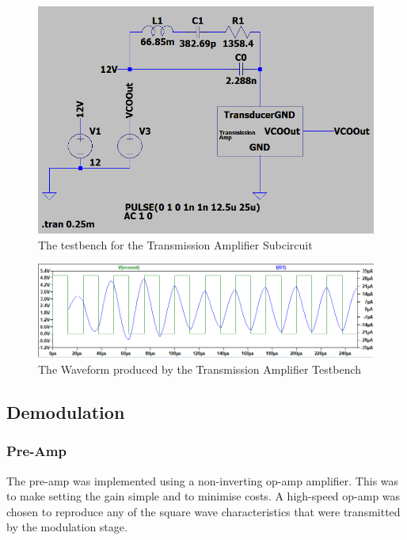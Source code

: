 \begin{figure}[H]
    \centering 
    \includegraphics[width=\textwidth]{../Circuits/Images/TransmissionAmp/TestBenchScreencap}
    \caption{The testbench for the Transmission Amplifier Subcircuit}
    \label{fig:TransmissionAmpTestBench}
\end{figure}

\begin{figure}[H]
    \centering 
    \includegraphics[width=\textwidth]{../Circuits/Images/TransmissionAmp/TestBenchWaveform}
    \caption{The Waveform produced by the Transmission Amplifier Testbench}
    \label{fig:TransmissionAmpTestBenchWaveform}
\end{figure}

\subsection{Demodulation}

\subsubsection{Pre-Amp}
The pre-amp was implemented using a non-inverting op-amp amplifier. 
This was to make setting the gain simple and to minimise costs. 
A high-speed op-amp was chosen to reproduce any of the square wave characteristics that were transmitted by the modulation stage.

